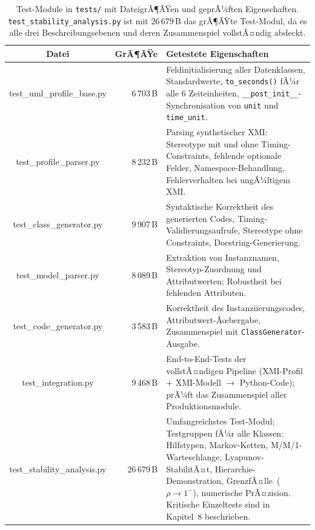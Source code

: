 ﻿\documentclass[a4paper,12pt]{report}
\theoremstyle{definition}
\begin{document}
\begin{table}[H]
	\small
	\centering
	\renewcommand{\arraystretch}{1.35}
	\begin{tabular}{@{} C r p{6.4cm} @{}}
		\toprule
		\normalfont\textbf{Datei} &
		\textbf{GrÃ¶ÃŸe} &
		\textbf{Getestete Eigenschaften} \\
		\midrule
		test\_uml\_profile\_base.py  & 6\,703\,B &
		Feldinitialisierung aller Datenklassen, Standardwerte,
		\texttt{to\_seconds()} fÃ¼r alle 6 Zeiteinheiten,
		\texttt{\_\_post\_init\_\_}-Synchronisation von
		\texttt{unit} und \texttt{time\_unit}. \\
		
		test\_profile\_parser.py     & 8\,232\,B &
		Parsing synthetischer XMI: Stereotype mit und ohne
		Timing-Constraints, fehlende optionale Felder,
		Namespace-Behandlung, Fehlerverhalten bei ungÃ¼ltigem XMI. \\
		
		test\_class\_generator.py    & 9\,907\,B &
		Syntaktische Korrektheit des generierten Codes,
		Timing-Validierungsaufrufe, Stereotype ohne Constraints,
		Docstring-Generierung. \\
		
		test\_model\_parser.py       & 8\,089\,B &
		Extraktion von Instanznamen, Stereotyp-Zuordnung und
		Attributwerten; Robustheit bei fehlenden Attributen. \\
		
		test\_code\_generator.py     & 3\,583\,B &
		Korrektheit des Instanziierungscodes,
		Attributwert-Ãœbergabe, Zusammenspiel mit
		\texttt{ClassGenerator}-Ausgabe. \\
		
		test\_integration.py         & 9\,468\,B &
		End-to-End-Tests der vollstÃ¤ndigen Pipeline
		(XMI-Profil $+$ XMI-Modell $\to$ Python-Code);
		prÃ¼ft das Zusammenspiel aller Produktionsmodule. \\
		
		test\_stability\_analysis.py & 26\,679\,B &
		Umfangreichstes Test-Modul; Testgruppen fÃ¼r alle Klassen:
		Hilfstypen, Markov-Ketten, M/M/1-Warteschlange,
		Lyapunov-StabilitÃ¤t, Hierarchie-Demonstration,
		GrenzfÃ¤lle~($\rho \to 1^{-}$), numerische PrÃ¤zision.
		Kritische Einzeltests sind in Kapitel~8 beschrieben. \\
		\bottomrule
	\end{tabular}
	\caption{Test-Module in \texttt{tests/} mit DateigrÃ¶ÃŸen und
		geprÃ¼ften Eigenschaften.
		\texttt{test\_stability\_analysis.py} ist mit 26\,679\,B
		das grÃ¶ÃŸte Test-Modul, da es alle drei Beschreibungsebenen
		und deren Zusammenspiel vollstÃ¤ndig abdeckt.}
\label{tab:test-module}
	\label{tab:module-tests}
\end{table}
\end{document}
